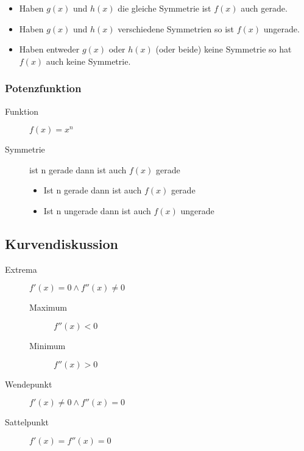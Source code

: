 \documentclass[a4paper]{scrartcl}
\begin{document}
\begin{description}
                \begin{itemize}
                    \item Haben $g(x)$ und $h(x)$ die gleiche Symmetrie ist $f(x)$ auch gerade.
                    \item Haben $g(x)$ und $h(x)$ verschiedene Symmetrien so ist $f(x)$ ungerade.
                    \item Haben entweder $g(x)$ oder $h(x)$ (oder beide) keine Symmetrie so hat $f(x)$ auch keine Symmetrie.
                \end{itemize}  
        \end{description}
        
        \subsubsection{Potenzfunktion}
           \begin{description}
               \item[Funktion] $f(x) = x^n$ 
               \item[Symmetrie] ist n gerade dann ist auch $f(x)$ gerade
               \begin{itemize}
                   \item Ist n gerade dann ist auch $f(x)$ gerade
                   \item Ist n ungerade dann ist auch $f(x)$ ungerade
               \end{itemize} 
           \end{description}       
    

           \subsection{Kurvendiskussion}
                \begin{description}
                    \item[Extrema] \(f'(x) = 0 \wedge f''(x) \neq 0\)
                    \begin{description}
                        \item[Maximum] \(f''(x) < 0\)
                        \item[Minimum]  \(f''(x) > 0\)
                    \end{description}
                    \item[Wendepunkt] \( f'(x) \neq 0 \wedge f''(x) = 0 \)
                    \item[Sattelpunkt] \(f'(x) = f''(x) = 0\) 
                \end{description}
\end{document}
